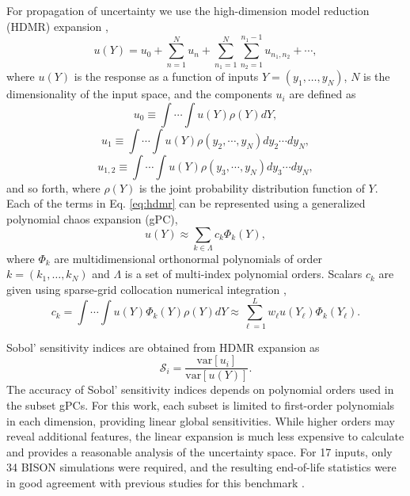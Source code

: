 \documentclass{anstrans} \usepackage{amsmath} \usepackage{amssymb}
\begin{document}
For propagation of uncertainty we use the high-dimension model reduction (HDMR) expansion \cite{hdmr},
\begin{equation}\label{eq:hdmr}
  u(Y) = u_0 + \sum_{n=1}^N u_n + \sum_{n_1=1}^N\sum_{n_2=1}^{n_1-1} u_{n_1,n_2} + \cdots,
\end{equation}
where $u(Y)$ is the response as a function of inputs $Y=(y_1,\ldots,y_N)$, $N$ is the dimensionality of the
input space, and the components $u_i$ are defined as
\begin{equation}
  u_0 \equiv \int\cdots\int u(Y) \rho(Y) dY,
\end{equation}
\vspace{-10pt}
\begin{equation}
  u_1 \equiv \int\cdots\int u(Y) \rho(y_2,\cdots,y_N) dy_2\cdots dy_N,
\end{equation}
\vspace{-10pt}
\begin{equation}
  u_{1,2} \equiv \int\cdots\int u(Y) \rho(y_3,\cdots,y_N) dy_3\cdots dy_N,
\end{equation}
and so forth, where $\rho(Y)$ is the joint probability distribution function of $Y$.
Each of the terms in Eq. \ref{eq:hdmr} can be represented using a generalized polynomial chaos
expansion (gPC),
\begin{equation}
  u(Y) \approx \sum_{k\in\Lambda}c_k\Phi_k(Y),
\end{equation}
where $\Phi_k$ are multidimensional orthonormal polynomials of order $k=(k_1,\ldots,k_N)$ and $\Lambda$ is a
set
of multi-index polynomial orders.  Scalars $c_k$ are given using
sparse-grid collocation numerical integration \cite{smolyak},
\begin{equation}
  c_k = \int\cdots\int u(Y) \Phi_k(Y) \rho(Y) dY \approx \sum_{\ell=1}^L w_\ell u(Y_\ell) \Phi_k(Y_\ell).
\end{equation}

Sobol' sensitivity indices are obtained from HDMR expansion as \cite{sobolIndices}
\begin{equation}
  \mathcal{S}_i = \frac{\text{var}[u_i]}{\text{var}[u(Y)]}.
\end{equation}
The accuracy of Sobol' sensitivity indices depends on polynomial orders used in the subset
gPCs.  For this work, each subset is limited to first-order polynomials in
each dimension, providing linear global sensitivities.  While higher orders may reveal
additional features, the linear expansion is much less expensive to calculate and provides a reasonable
analysis of the uncertainty space.  For 17 inputs, only 34 BISON simulations were required, and the resulting
end-of-life statistics were in good agreement with previous studies for this benchmark \cite{dakotaBisonStudy}.
\end{document}
